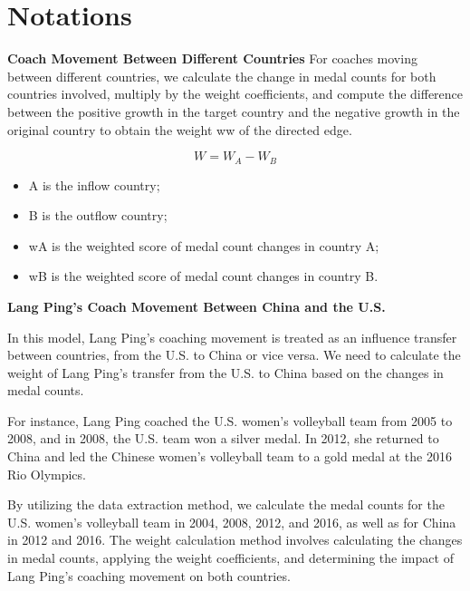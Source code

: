 \documentclass{mcmthesis}
\begin{document}
\section{Notations}


{\bf Coach Movement Between Different Countries}
For coaches moving between different countries, we calculate the change in medal counts for both countries involved, multiply by the weight coefficients, and compute the difference between the positive growth in the target country and the negative growth in the original country to obtain the weight ww of the directed edge.

\begin{equation} \label{1}
    W = W_A - W_B
\end{equation}

\begin{itemize}
    \item A is the inflow country;
    \item B is the outflow country;
    \item wA is the weighted score of medal count changes in country A;
    \item wB is the weighted score of medal count changes in country B.
\end{itemize}

{\bf Lang Ping's Coach Movement Between China and the U.S.}

In this model, Lang Ping's coaching movement is treated as an influence transfer between countries, from the U.S. to China or vice versa. We need to calculate the weight of Lang Ping's transfer from the U.S. to China based on the changes in medal counts.

For instance, Lang Ping coached the U.S. women's volleyball team from 2005 to 2008, and in 2008, the U.S. team won a silver medal. In 2012, she returned to China and led the Chinese women's volleyball team to a gold medal at the 2016 Rio Olympics.

By utilizing the data extraction method, we calculate the medal counts for the U.S. women's volleyball team in 2004, 2008, 2012, and 2016, as well as for China in 2012 and 2016. The weight calculation method involves calculating the changes in medal counts, applying the weight coefficients, and determining the impact of Lang Ping's coaching movement on both countries.
\end{document}
